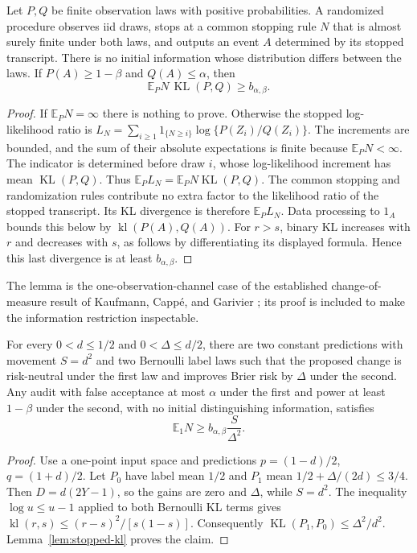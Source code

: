 \begin{lemma}
\label{lem:stopped-kl}
Let $P,Q$ be finite observation laws with positive probabilities.
A randomized procedure observes iid draws, stops at a common stopping rule
$N$ that is almost surely finite under both laws, and outputs an event $A$
determined by its stopped transcript.
There is no initial information whose distribution differs between the laws.
If $P(A)\ge1-\beta$ and $Q(A)\le\alpha$, then
\[
 \mathbb E_PN\,\operatorname{KL}(P,Q)\ge b_{\alpha,\beta}.
\]
\end{lemma}
\begin{proof}
If $\mathbb E_PN=\infty$ there is nothing to prove. Otherwise the stopped
log-likelihood ratio is
$L_N=\sum_{i\ge1}1_{\{N\ge i\}}\log\{P(Z_i)/Q(Z_i)\}$.
The increments are bounded, and the sum of their absolute expectations
is finite because $\mathbb E_PN<\infty$. The indicator is determined
before draw $i$, whose log-likelihood increment has mean
$\operatorname{KL}(P,Q)$. Thus
$\mathbb E_PL_N=\mathbb E_PN\operatorname{KL}(P,Q)$.
The common stopping and randomization rules contribute no extra factor
to the likelihood ratio of the stopped transcript. Its KL divergence is
therefore $\mathbb E_PL_N$. Data processing to $1_A$ bounds this below by
$\operatorname{kl}(P(A),Q(A))$.
For $r>s$, binary KL increases with $r$ and decreases with $s$, as follows
by differentiating its displayed formula. Hence this last divergence is
at least $b_{\alpha,\beta}$.
\end{proof}
The lemma is the one-observation-channel case of the established
change-of-measure result of Kaufmann, Capp\'e, and Garivier
\cite[Lemma 1 and Appendix A.1]{kaufmann2016}; its proof is included to
make the information restriction inspectable.

\begin{theorem}
\label{thm:movement-lower}
For every $0<d\le1/2$ and $0<\Delta\le d/2$, there are two constant
predictions with movement $S=d^2$ and two Bernoulli label laws such that
the proposed change is risk-neutral under the first law and improves
Brier risk by $\Delta$ under the second. Any audit with false acceptance
at most $\alpha$ under the first and power at least $1-\beta$ under the
second, with no initial distinguishing information, satisfies
\[
 \mathbb E_1N\ge b_{\alpha,\beta}\frac{S}{\Delta^2}.
\]
\end{theorem}
\begin{proof}
Use a one-point input space and predictions $p=(1-d)/2$, $q=(1+d)/2$.
Let $P_0$ have label mean $1/2$ and $P_1$ mean
$1/2+\Delta/(2d)\le3/4$. Then $D=d(2Y-1)$, so the gains are zero
and $\Delta$, while $S=d^2$.
The inequality $\log u\le u-1$ applied to both Bernoulli KL terms gives
$\operatorname{kl}(r,s)\le(r-s)^2/[s(1-s)]$.
Consequently $\operatorname{KL}(P_1,P_0)\le\Delta^2/d^2$.
Lemma~\ref{lem:stopped-kl} proves the claim.
\end{proof}

